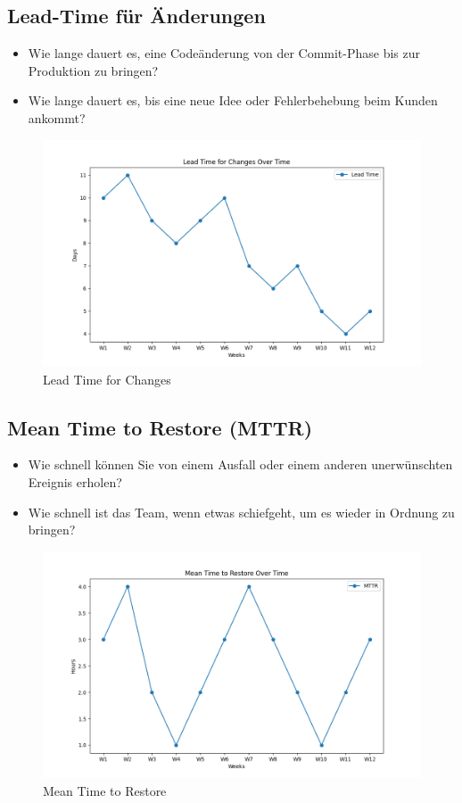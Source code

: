 \documentclass{orgstandard}
\begin{document}
\subsection{Lead-Time für Änderungen}
\label{sec:orgc80756c}
\begin{itemize}
\item Wie lange dauert es, eine Codeänderung von der Commit-Phase bis zur Produktion zu bringen?
\item Wie lange dauert es, bis eine neue Idee oder Fehlerbehebung beim Kunden ankommt?
\end{itemize}
\begin{figure}[htbp]
\centering
\includegraphics[width=.65\linewidth]{img/LeadTimeForChanges.png}
\caption{\label{fig:org3dc4154}Lead Time for Changes}
\end{figure}

\subsection{Mean Time to Restore (MTTR)}
\label{sec:org95d3489}
\begin{itemize}
\item Wie schnell können Sie von einem Ausfall oder einem anderen unerwünschten Ereignis erholen?
\item Wie schnell ist das Team, wenn etwas schiefgeht, um es wieder in Ordnung zu bringen?
\end{itemize}
\begin{figure}[htbp]
\centering
\includegraphics[width=.65\linewidth]{img/MTTR.png}
\caption{\label{fig:org414b74a}Mean Time to Restore}
\end{figure}
\end{document}
